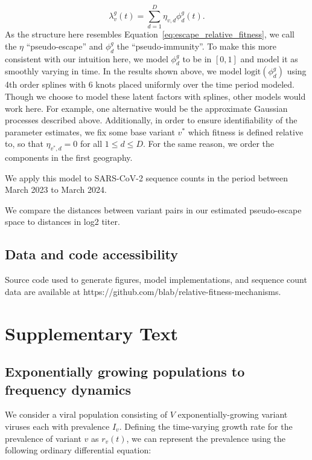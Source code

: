 \documentclass[12pt,oneside,letterpaper]{article}
\newcommand{\varEscape}{\eta}
\begin{document}
\begin{equation}
    \lambda_{v}^{g}(t) = \sum_{d=1}^{D} \varEscape_{v,d} \phi_{d}^{g}(t).
\end{equation}
As the structure here resembles Equation~\ref{eq:escape_relative_fitness}, we call the $\varEscape$ ``pseudo-escape'' and $\phi_{d}^{g}$ the ``pseudo-immunity''.
To make this more consistent with our intuition here, we model $\phi_{d}^{g}$ to be in $[0,1]$ and model it as smoothly varying in time.
In the results shown above, we model $\text{logit}(\phi_{d}^{g})$ using 4th order splines with 6 knots placed uniformly over the time period modeled.
Though we choose to model these latent factors with splines, other models would work here.
For example, one alternative would be the approximate Gaussian processes described above.
Additionally, in order to ensure identifiability of the parameter estimates, we fix some base variant $v^*$ which fitness is defined relative to, so that $\varEscape_{v^*, d} = 0$ for all $1\leq d\leq D$.
For the same reason, we order the components in the first geography.

We apply this model to SARS-CoV-2 sequence counts in the period between March 2023 to March 2024.

We compare the distances between variant pairs in our estimated pseudo-escape space to distances in log2 titer.

\subsection*{Data and code accessibility}

Source code used to generate figures, model implementations, and sequence count data are available at https://github.com/blab/relative-fitness-mechanisms.

\newpage

\section*{Supplementary Text}

\subsection{Exponentially growing populations to frequency dynamics}%

We consider a viral population consisting of $V$ exponentially-growing variant viruses each with prevalence $I_{v}$.
Defining the time-varying growth rate for the prevalence of variant $v$ as $r_{v}(t)$, we can represent the prevalence using the following ordinary differential equation:
\end{document}
